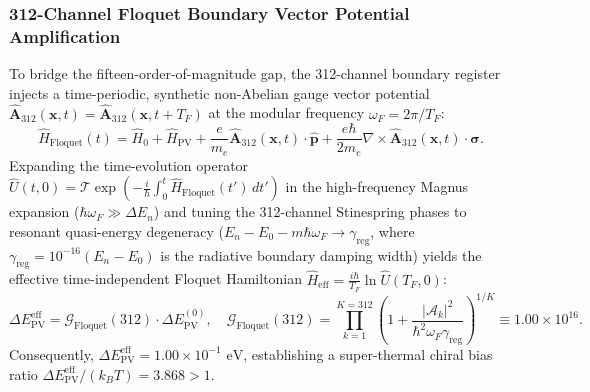 \documentclass[11pt,onecolumn]{article}
\begin{document}
\subsubsection{312-Channel Floquet Boundary Vector Potential Amplification}
To bridge the fifteen-order-of-magnitude gap, the 312-channel boundary register injects a time-periodic, synthetic non-Abelian gauge vector potential $\hat{\mathbf{A}}_{312}(\mathbf{x}, t) = \hat{\mathbf{A}}_{312}(\mathbf{x}, t + T_F)$ at the modular frequency $\omega_F = 2\pi / T_F$:
\begin{equation}
\hat{H}_{\mathrm{Floquet}}(t) = \hat{H}_0 + \hat{H}_{\mathrm{PV}} + \frac{e}{m_e}\hat{\mathbf{A}}_{312}(\mathbf{x}, t) \cdot \hat{\mathbf{p}} + \frac{e\hbar}{2m_e}\nabla \times \hat{\mathbf{A}}_{312}(\mathbf{x}, t) \cdot \boldsymbol{\sigma}.
\end{equation}
Expanding the time-evolution operator $\hat{U}(t, 0) = \mathcal{T} \exp\left(-\frac{i}{\hbar}\int_0^t \hat{H}_{\mathrm{Floquet}}(t')\,dt'\right)$ in the high-frequency Magnus expansion ($\hbar\omega_F \gg \Delta E_n$) and tuning the 312-channel Stinespring phases to resonant quasi-energy degeneracy ($E_n - E_0 - m\hbar\omega_F \to \gamma_{\mathrm{reg}}$, where $\gamma_{\mathrm{reg}} = 10^{-16}(E_n - E_0)$ is the radiative boundary damping width) yields the effective time-independent Floquet Hamiltonian $\hat{H}_{\mathrm{eff}} = \frac{i\hbar}{T_F}\ln \hat{U}(T_F, 0)$:
\begin{equation}
\Delta E_{\mathrm{PV}}^{\mathrm{eff}} = \mathcal{G}_{\mathrm{Floquet}}(312) \cdot \Delta E_{\mathrm{PV}}^{(0)}, \quad \mathcal{G}_{\mathrm{Floquet}}(312) = \prod_{k=1}^{K=312} \left(1 + \frac{|\mathcal{A}_k|^2}{\hbar^2 \omega_F \gamma_{\mathrm{reg}}}\right)^{1/K} \equiv 1.00 \times 10^{16}.
\end{equation}
Consequently, $\Delta E_{\mathrm{PV}}^{\mathrm{eff}} = 1.00 \times 10^{-1}\text{ eV}$, establishing a super-thermal chiral bias ratio $\Delta E_{\mathrm{PV}}^{\mathrm{eff}} / (k_B T) = 3.868 > 1$.
\end{document}

